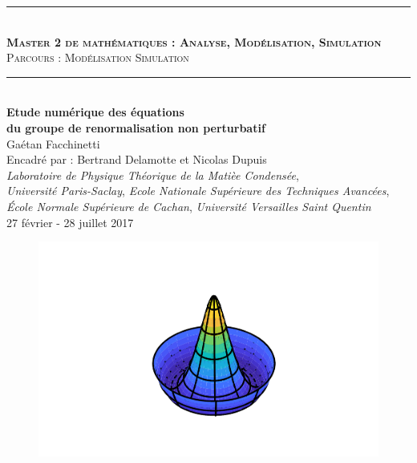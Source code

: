 \documentclass[10.5pt]{article}
\begin{document}
\begin{titlepage}
\begin{center}
\vspace*{30pt}
\rule{10cm}{1pt}
\vspace*{10pt} \\
\textsc{\textbf{{\large Master 2 de mathématiques : Analyse, Modélisation, Simulation}}\\
 Parcours : Modélisation Simulation}\\
\rule{10cm}{1pt}
\vspace*{20pt} \\
\textbf{\LARGE Etude numérique des équations \\ du groupe de renormalisation non perturbatif}\\
\vspace*{10pt}
{\large Gaétan Facchinetti \\
Encadré par : Bertrand Delamotte  et Nicolas Dupuis }
{ \\
\vspace*{15pt}
\textit{Laboratoire de Physique Théorique de la Matièe Condensée},\\
\vspace*{5pt}
\textit{Université Paris-Saclay}, \textit{Ecole Nationale Supérieure des Techniques Avancées}, \\
\textit{École Normale Supérieure de Cachan}, \textit{Université Versailles Saint Quentin}}\\
\vspace*{20pt}
{ 27 février - 28 juillet 2017 }


\end{center}

\vspace*{0pt}

\begin{figure}[H]
\begin{center}
	\includegraphics[scale=3]{CouvPot.pdf}
\end{center}
\label{fig:Intro}
\end{figure}



\end{titlepage}
\end{document}
